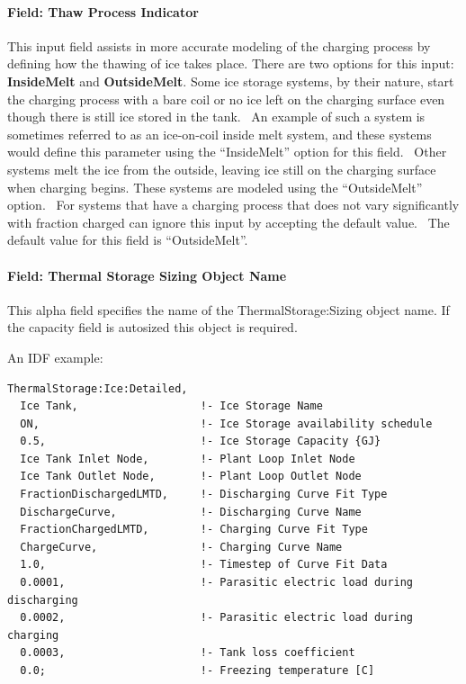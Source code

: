 \paragraph{Field: Thaw Process Indicator}\label{field-thaw-process-indicator}

This input field assists in more accurate modeling of the charging process by defining how the thawing of ice takes place. There are two options for this input: \textbf{InsideMelt} and \textbf{OutsideMelt}. Some ice storage systems, by their nature, start the charging process with a bare coil or no ice left on the charging surface even though there is still ice stored in the tank.~ An example of such a system is sometimes referred to as an ice-on-coil inside melt system, and these systems would define this parameter using the ``InsideMelt'' option for this field.~ Other systems melt the ice from the outside, leaving ice still on the charging surface when charging begins. These systems are modeled using the ``OutsideMelt'' option.~ For systems that have a charging process that does not vary significantly with fraction charged can ignore this input by accepting the default value.~ The default value for this field is ``OutsideMelt''.

\paragraph{Field: Thermal Storage Sizing Object Name}\label{field-thermal-storage-sizing-object-name-002}

This alpha field specifies the name of the ThermalStorage:Sizing object name. If the capacity field is autosized this object is required.

An IDF example:

\begin{lstlisting}
ThermalStorage:Ice:Detailed,
  Ice Tank,                   !- Ice Storage Name
  ON,                         !- Ice Storage availability schedule
  0.5,                        !- Ice Storage Capacity {GJ}
  Ice Tank Inlet Node,        !- Plant Loop Inlet Node
  Ice Tank Outlet Node,       !- Plant Loop Outlet Node
  FractionDischargedLMTD,     !- Discharging Curve Fit Type
  DischargeCurve,             !- Discharging Curve Name
  FractionChargedLMTD,        !- Charging Curve Fit Type
  ChargeCurve,                !- Charging Curve Name
  1.0,                        !- Timestep of Curve Fit Data
  0.0001,                     !- Parasitic electric load during discharging
  0.0002,                     !- Parasitic electric load during charging
  0.0003,                     !- Tank loss coefficient
  0.0;                        !- Freezing temperature [C]
\end{lstlisting}

